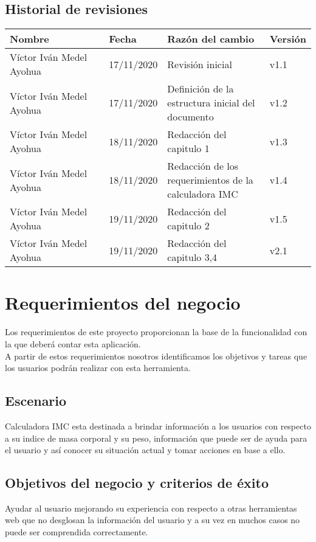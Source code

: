 \documentclass[12pt,a4paper]{book}
\begin{document}
\section{Historial de revisiones}
\vspace{0.5 cm}
\begin{table}[h!]
\centering
\begin{tabular}{|p{0.35\linewidth}|p{0.15\linewidth}|p{0.35\linewidth}|p{0.15\linewidth}|}
\hline
\textbf{Nombre}&\textbf{Fecha}&\textbf{Razón del cambio}&\textbf{Versión}
\\\hline
Víctor Iván Medel Ayohua&17/11/2020&Revisión inicial&v1.1\\\hline
Víctor Iván Medel Ayohua&17/11/2020&Definición de la estructura inicial del documento&v1.2\\\hline
Víctor Iván Medel Ayohua&18/11/2020&Redacción del capitulo 1&v1.3\\\hline
Víctor Iván Medel Ayohua&18/11/2020&Redacción de los requerimientos de la calculadora IMC&v1.4\\\hline
Víctor Iván Medel Ayohua&19/11/2020&Redacción del capitulo 2&v1.5\\\hline
Víctor Iván Medel Ayohua&19/11/2020&Redacción del capitulo 3,4 &v2.1\\\hline
\end{tabular}
\end{table}

\chapter{Requerimientos del negocio}
Los requerimientos de este proyecto proporcionan la base de la funcionalidad con la que deberá contar esta aplicación.\\
A partir de estos requerimientos nosotros identificamos los objetivos y tareas que los usuarios podrán realizar con esta herramienta.
\section{Escenario}
\vspace{0.5 cm}
Calculadora IMC esta destinada a brindar información a los usuarios con respecto a su indice de masa corporal y su peso, información que puede ser de ayuda para el usuario y así conocer su situación actual y tomar acciones en base a ello.
\section{Objetivos del negocio y criterios de éxito}
\vspace{0.5 cm}
Ayudar al usuario mejorando su experiencia con respecto a otras herramientas web que no desglosan la información del usuario y a su vez en muchos casos no puede ser comprendida correctamente.
\newpage
\vspace{0.5 cm}
\end{document}
